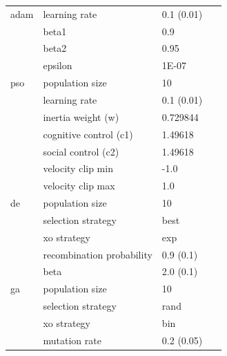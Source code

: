 \begin{table}[htbp]
{\begin{tabular}{llll}
                  adam               & learning rate             & 0.1 (0.01)     & ~\cite{ref:kingma:2014}    \\
                                     & beta1                     & 0.9            &                            \\
                                     & beta2                     & 0.95           &                            \\
                                     & epsilon                   & 1E-07          &                            \\
                  pso                & population size           & 10             & ~\cite{ref:van:2010}       \\
                                     & learning rate             & 0.1 (0.01)     &                            \\
                                     & inertia weight (w)        & 0.729844       &                            \\
                                     & cognitive control (c1)    & 1.49618        &                            \\
                                     & social control (c2)       & 1.49618        &                            \\
                                     & velocity clip min         & -1.0           &                            \\
                                     & velocity clip max         & 1.0            &                            \\
                  de                 & population size           & 10             & ~\cite{ref:mezura:2006}    \\
                                     & selection strategy        & best           &                            \\
                                     & xo strategy               & exp            &                            \\
                                     & recombination probability & 0.9 (0.1)      &                            \\
                                     & beta                      & 2.0 (0.1)      &                            \\
                  ga                 & population size           & 10             & ~\cite{ref:lambora:2019}   \\
                                     & selection strategy        & rand           &                            \\
                                     & xo strategy               & bin            &                            \\
                                     & mutation rate             & 0.2 (0.05)     &                            \\
            \end{tabular}%
      }
\end{table}%

